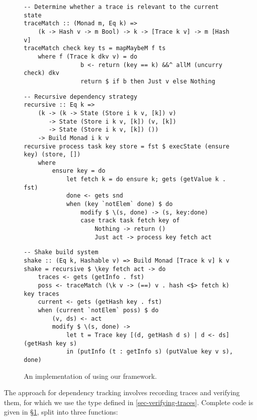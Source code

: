 \begin{figure}
\begin{verbatim}
-- Determine whether a trace is relevant to the current state
traceMatch :: (Monad m, Eq k) =>
    (k -> Hash v -> m Bool) -> k -> [Trace k v] -> m [Hash v]
traceMatch check key ts = mapMaybeM f ts
    where f (Trace k dkv v) = do
                b <- return (key == k) &&^ allM (uncurry check) dkv
                return $ if b then Just v else Nothing
\end{verbatim}
\vspace{1mm}
\begin{verbatim}
-- Recursive dependency strategy
recursive :: Eq k =>
    (k -> (k -> State (Store i k v, [k]) v)
       -> State (Store i k v, [k]) (v, [k])
       -> State (Store i k v, [k]) ())
    -> Build Monad i k v
recursive process task key store = fst $ execState (ensure key) (store, [])
    where
        ensure key = do
            let fetch k = do ensure k; gets (getValue k . fst)
            done <- gets snd
            when (key `notElem` done) $ do
                modify $ \(s, done) -> (s, key:done)
                case track task fetch key of
                    Nothing -> return ()
                    Just act -> process key fetch act
\end{verbatim}
\vspace{1mm}
\begin{verbatim}
-- Shake build system
shake :: (Eq k, Hashable v) => Build Monad [Trace k v] k v
shake = recursive $ \key fetch act -> do
    traces <- gets (getInfo . fst)
    poss <- traceMatch (\k v -> (==) v . hash <$> fetch k) key traces
    current <- gets (getHash key . fst)
    when (current `notElem` poss) $ do
        (v, ds) <- act
        modify $ \(s, done) ->
            let t = Trace key [(d, getHash d s) | d <- ds] (getHash key s)
            in (putInfo (t : getInfo s) (putValue key v s), done)

\end{verbatim}
\vspace{-2mm}
\caption{An implementation of \Shake using our framework.}\label{fig-shake-implementation}
\vspace{-2mm}
\end{figure}

The \Shake approach for dependency tracking involves recording traces and verifying them, for which we use the  type defined in \ref{sec-verifying-traces}. Complete code is given in \S\ref{fig-shake-implementation}, split into three functions:

